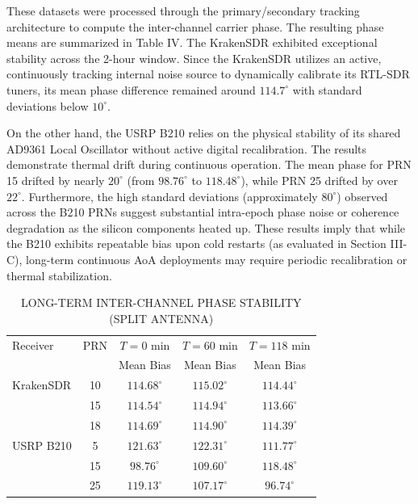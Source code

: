 \documentclass[conference]{IEEEtran}
\begin{document}
These datasets were processed through the primary/secondary tracking architecture to compute the inter-channel carrier phase. The resulting phase means are summarized in Table IV. The KrakenSDR exhibited exceptional stability across the 2-hour window. Since the KrakenSDR utilizes an active, continuously tracking internal noise source to dynamically calibrate its RTL-SDR tuners, its mean phase difference remained around $114.7^{\circ}$ with standard deviations below $10^{\circ}$.

On the other hand, the USRP B210 relies on the physical stability of its shared AD9361 Local Oscillator without active digital recalibration. The results demonstrate thermal drift during continuous operation. The mean phase for PRN 15 drifted by nearly $20^{\circ}$ (from $98.76^{\circ}$ to $118.48^{\circ}$), while PRN 25 drifted by over $22^{\circ}$. Furthermore, the high standard deviations (approximately $80^{\circ}$) observed across the B210 PRNs suggest substantial intra-epoch phase noise or coherence degradation as the silicon components heated up. These results imply that while the B210 exhibits repeatable bias upon cold restarts (as evaluated in Section III-C), long-term continuous AoA deployments may require periodic recalibration or thermal stabilization.

\begin{table}[H]
\centering
\caption{LONG-TERM INTER-CHANNEL PHASE STABILITY (SPLIT ANTENNA)}
\begin{tabular}{lcccc}
\toprule
Receiver & PRN & $T=0$ min & $T=60$ min & $T=118$ min \\
         &     & Mean Bias & Mean Bias & Mean Bias \\
\midrule
KrakenSDR & 10 & $114.68^{\circ}$ & $115.02^{\circ}$ & $114.44^{\circ}$ \\
          & 15 & $114.54^{\circ}$ & $114.94^{\circ}$ & $113.66^{\circ}$ \\
          & 18 & $114.69^{\circ}$ & $114.90^{\circ}$ & $114.39^{\circ}$ \\
\midrule
USRP B210 & 5  & $121.63^{\circ}$ & $122.31^{\circ}$ & $111.77^{\circ}$ \\
          & 15 & $98.76^{\circ}$  & $109.60^{\circ}$ & $118.48^{\circ}$ \\
          & 25 & $119.13^{\circ}$ & $107.17^{\circ}$ & $96.74^{\circ}$  \\
\bottomrule
\end{tabular}
\end{table}
\end{document}
